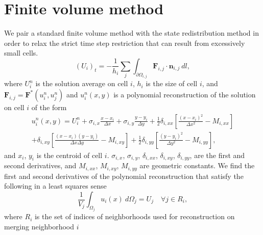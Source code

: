 
\section{Finite volume method}
We pair a standard finite volume method with the state redistribution method in order to relax the strict time step restriction that can result from excessively small cells. 
\begin{equation} 
(U_i)_t =  - \frac{1}{h_i}\sum_{j} \int_{\partial \Omega_{i,j}} \mathbf{F}_{i,j} \cdot \mathbf{n}_{i,j}~dl,\label{eq:scheme}
\end{equation}
where $U^n_i$ is the solution average on cell $i$, $h_i$ is the size of cell $i$, and $\mathbf{F}_{i,j} = \mathbf{F}^*(u^n_{i},u^n_{j})$ and $u^n_{i}(x,y)$ is a polynomial reconstruction of the solution on cell $i$ of the form
\begin{equation}\label{eq:uhat}
\begin{aligned}
	    u^n_i(x,y) = U^n_{i} +  \sigma_{i,x}\frac{x- x_i}{\Delta x} +   \sigma_{i,y}\frac{y- y_i}{\Delta y} + \frac{1}{2} \delta_{i, xx}\left[ \frac{(x -  x_i)^2 }{\Delta x^2} -  M_{i,xx}\right]\\
	    + \delta_{i, xy}\left[ \frac{(x -  x_i) (y -  y_i) }{\Delta x \Delta y} -  M_{i,xy}\right] + \frac{1}{2} \delta_{i, yy}\left[ \frac{(y -  y_i)^2 }{\Delta y^2} -   M_{i,yy}\right],
\end{aligned}
\end{equation}
and $ x_i$, $ y_i$ is the centroid of cell $i$. $ \sigma_{i,x}$, $ \sigma_{i,y}$, $ \delta_{i,xx}$, $ \delta_{i,xy}$, $ \delta_{i,yy}$, are the first and second derivatives, and $  M_{i,xx}$, $ M_{i,xy}$,  $ M_{i,yy}$ are geometric constants. We find the first and second derivatives of the polynomial reconstruction that satisfy the following in a least squares sense
\begin{equation}\label{eq:qi}
\frac{1}{ V_j}\int_{\Omega_j} u_i(x)~d\Omega_j = U_j \quad \forall j \in R_i,
\end{equation}
where $R_i$ is the set of indices of neighborhoods used for reconstruction on merging neighborhood $i$

